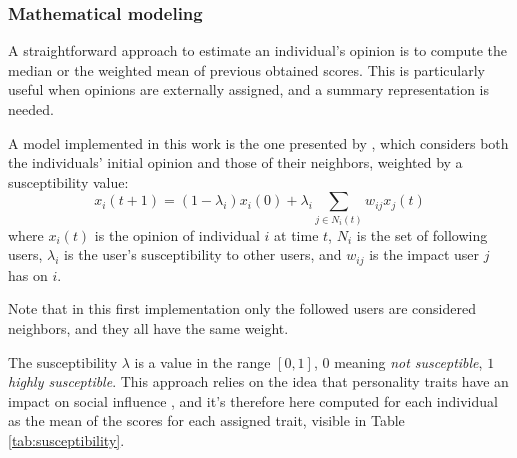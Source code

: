 %


\subsubsection{Mathematical modeling}
A straightforward approach to estimate an individual's opinion is to compute the median or the weighted mean of previous obtained scores.
This is particularly useful when opinions are externally assigned, and a summary representation is needed.

\medskip
A model implemented in this work is the one presented by \citet{friedkin_1990}, which considers both the individuals' initial opinion and those of their neighbors, weighted by a susceptibility value:
\[
x_i(t + 1) = (1 - \lambda_i) x_i(0) + \lambda_i   \sum_{j \in N_i(t)} w_{ij} x_j(t)
\]
where $x_i(t)$ is the opinion of individual $i$ at time $t$, $N_i$ is the set of following users, $\lambda_i$ is the user's susceptibility to other users, and $w_{ij}$ is the impact user $j$ has on $i$. 

Note that in this first implementation only the followed users are considered neighbors, and they all have the same weight.

The susceptibility $\lambda$ is a value in the range $[0,1]$, $0$ meaning \textit{not susceptible}, $1$ \textit{highly susceptible}.
This approach relies on the idea that personality traits have an impact on social influence \cite{oyibo2019personality}, and it's therefore here computed for each individual as the mean of the scores for each assigned trait, visible in Table \ref{tab:susceptibility}.

